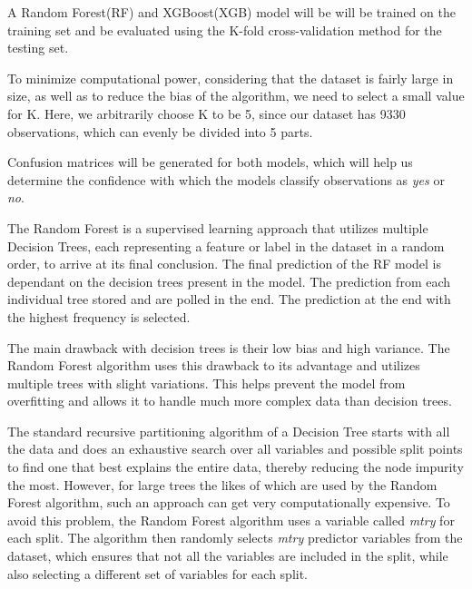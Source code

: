\documentclass[runningheads]{llncs}
\makeatletter
\let\oldsubsubsection\subsubsection
\renewcommand\subsubsection{\@ifstar{\oldsubsubsection}{\oldsubsubsection*}}
\makeatother
\begin{document}
A Random Forest(RF) and XGBoost(XGB) model will be will be trained on
the training set and be evaluated using the K-fold cross-validation
method for the testing set.

To minimize computational power, considering that the dataset is fairly
large in size, as well as to reduce the bias of the algorithm, we need
to select a small value for K. Here, we arbitrarily choose K to be 5,
since our dataset has 9330 observations, which can evenly be divided
into 5 parts.

Confusion matrices will be generated for both models, which will help us
determine the confidence with which the models classify observations as
\emph{yes} or \emph{no}.

\hypertarget{random-forest}{%
\subsubsection{Random Forest}\label{random-forest}}

The Random Forest is a supervised learning approach that utilizes
multiple Decision Trees, each representing a feature or label in the
dataset in a random order, to arrive at its final conclusion. The final
prediction of the RF model is dependant on the decision trees present in
the model. The prediction from each individual tree stored and are
polled in the end. The prediction at the end with the highest frequency
is selected.

The main drawback with decision trees is their low bias and high
variance. The Random Forest algorithm uses this drawback to its
advantage and utilizes multiple trees with slight variations. This helps
prevent the model from overfitting and allows it to handle much more
complex data than decision trees.

The standard recursive partitioning algorithm of a Decision Tree starts
with all the data and does an exhaustive search over all variables and
possible split points to find one that best explains the entire data,
thereby reducing the node impurity the most. However, for large trees
the likes of which are used by the Random Forest algorithm, such an
approach can get very computationally expensive. To avoid this problem,
the Random Forest algorithm uses a variable called \emph{mtry} for each
split. The algorithm then randomly selects \emph{mtry} predictor
variables from the dataset, which ensures that not all the variables are
included in the split, while also selecting a different set of variables
for each split.
\end{document}
